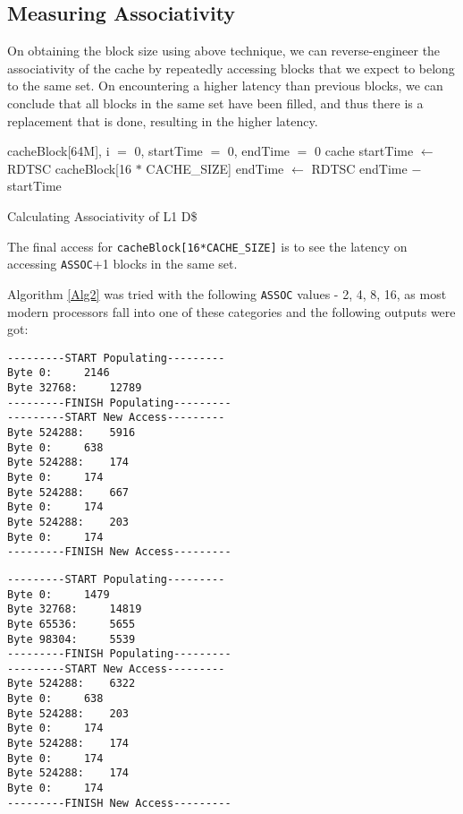 \documentclass[12pt,a4paper,english]{paper}
\newenvironment{colorboxed}[4][gray]{
\begin{tcolorbox}[colback=#1!3!white,colframe=#1(ryb)!50!black,title=\textbf{#2 #3},#4]
}{
\end{tcolorbox}
}
\begin{document}
\subsection{Measuring Associativity}
On obtaining the block size using above technique, we can reverse-engineer the associativity of the cache by repeatedly accessing blocks that we expect to belong to the same set. On encountering a higher latency than previous blocks, we can conclude that all blocks in the same set have been filled, and thus there is a replacement that is done, resulting in the higher latency.

\begin{algorithm}[H]
\SetAlgoLined
{}
  \init cacheBlock[64M], i $=$ 0, startTime $=$ 0, endTime $=$ 0\; 
  \clear cache\;
  startTime $\leftarrow$ RDTSC\;
    \access cacheBlock[16 $*$ CACHE\_SIZE]\;
  endTime $\leftarrow$ RDTSC\;
  \print endTime $-$ startTime\;
 \caption{Calculating Associativity of L1 D\$}
    \label{Alg2}
\end{algorithm}

The final access for \texttt{cacheBlock[16*CACHE\_SIZE]} is to see the latency on accessing \texttt{ASSOC}+1 blocks in the same set. 

Algorithm \ref{Alg2} was tried with the following \texttt{ASSOC} values - 2, 4, 8, 16, as most modern processors fall into one of these categories and the following outputs were got:

\begin{colorboxed}{Output: }{\texttt{\textbf{ASSOC = 2}}}{breakable}
\begin{verbatim}
---------START Populating---------
Byte 0: 	2146
Byte 32768: 	12789
---------FINISH Populating---------
---------START New Access---------
Byte 524288: 	5916
Byte 0: 	638
Byte 524288: 	174
Byte 0: 	174
Byte 524288: 	667
Byte 0: 	174
Byte 524288: 	203
Byte 0: 	174
---------FINISH New Access---------
\end{verbatim}
\end{colorboxed}

\begin{colorboxed}{Output: }{\texttt{\textbf{ASSOC = 4}}}{breakable}
\begin{verbatim}
---------START Populating---------
Byte 0: 	1479
Byte 32768: 	14819
Byte 65536: 	5655
Byte 98304: 	5539
---------FINISH Populating---------
---------START New Access---------
Byte 524288: 	6322
Byte 0: 	638
Byte 524288: 	203
Byte 0: 	174
Byte 524288: 	174
Byte 0: 	174
Byte 524288: 	174
Byte 0: 	174
---------FINISH New Access---------
\end{verbatim}
\end{colorboxed}
\end{document}
